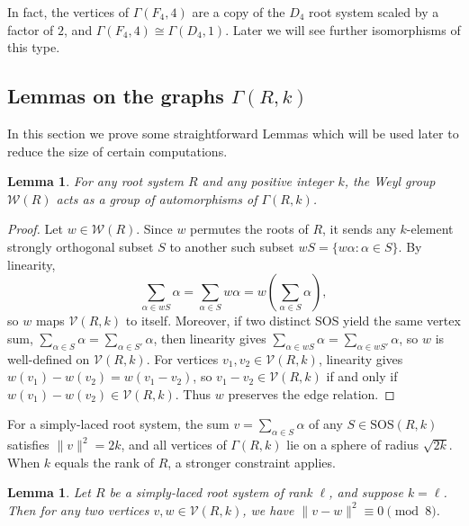 \documentclass[11pt]{article}
\newtheorem{lemma}[theorem]{Lemma}
\newcommand{\W}{\mathcal{W}}
\begin{document}
In fact, the vertices of $\Gamma(F_4, 4)$ are a copy of the $D_{4}$ root system scaled by a factor of $2$, and $\Gamma(F_4, 4) \cong \Gamma(D_4, 1)$. Later we will see further isomorphisms of this type. 


\subsection{Lemmas on the graphs $\Gamma(R, k)$}

In this section we prove some straightforward Lemmas which will be used later to reduce the size of certain computations.

\begin{lemma}\label{lem:weyl}
For any root system $R$ and any positive integer $k$, the Weyl group $\W(R)$ acts as a group of automorphisms of $\Gamma(R, k)$.
\end{lemma}

\begin{proof}
Let $w \in \W(R)$. Since $w$ permutes the roots of $R$, it sends any $k$-element strongly orthogonal subset $S$ to another such subset $wS = \{w\alpha : \alpha \in S\}$. By linearity,
\[
\sum_{\alpha \in wS} \alpha = \sum_{\alpha \in S} w\alpha = w\!\left(\sum_{\alpha \in S} \alpha\right)\!,
\]
so $w$ maps $\mathcal{V}(R, k)$ to itself. Moreover, if two distinct SOS yield the same vertex sum, $\sum_{\alpha \in S} \alpha = \sum_{\alpha \in S'} \alpha$, then linearity gives $\sum_{\alpha \in wS} \alpha = \sum_{\alpha \in wS'} \alpha$, so $w$ is well-defined on $\mathcal{V}(R,k)$. For vertices $v_1, v_2 \in \mathcal{V}(R, k)$, linearity gives $w(v_1) - w(v_2) = w(v_1 - v_2)$, so $v_1 - v_2 \in \mathcal{V}(R, k)$ if and only if $w(v_1) - w(v_2) \in \mathcal{V}(R, k)$. Thus $w$ preserves the edge relation.
\end{proof}

For a simply-laced root system, the sum $v = \sum_{\alpha \in S} \alpha$ of any $S \in \mathrm{SOS}(R, k)$ satisfies $\|v\|^2 = 2k$, and all vertices of $\Gamma(R, k)$ lie on a sphere of radius $\sqrt{2k}$. When $k$ equals the rank of $R$, a stronger constraint applies.

\begin{lemma}\label{lem:mod8}
Let $R$ be a simply-laced root system of rank $\ell$, and suppose $k = \ell$. Then for any two vertices $v, w \in \mathcal{V}(R, k)$, we have $\|v - w\|^2 \equiv 0 \pmod{8}$.
\end{lemma}
\end{document}
